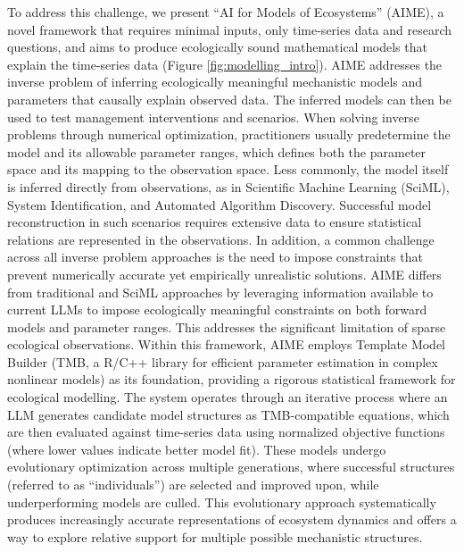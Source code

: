 To address this challenge, we present ``AI for Models of Ecosystems'' (AIME), a novel framework that requires minimal inputs, only time-series data and research questions, and aims to produce ecologically sound mathematical models that explain the time-series data (Figure \ref{fig:modelling_intro}). AIME addresses the inverse problem of inferring ecologically meaningful mechanistic models and parameters that causally explain observed data. The inferred models can then be used to test management interventions and scenarios. When solving inverse problems through numerical optimization, practitioners usually predetermine the model and its allowable parameter ranges, which defines both the parameter space and its mapping to the observation space. Less commonly, the model itself is inferred directly from observations, as in Scientific Machine Learning (SciML), System Identification, and Automated Algorithm Discovery. Successful model reconstruction in such scenarios requires extensive data to ensure statistical relations are represented in the observations. In addition, a common challenge across all inverse problem approaches is the need to impose constraints that prevent numerically accurate yet empirically unrealistic solutions. AIME differs from traditional and SciML approaches by leveraging information available to current LLMs to impose ecologically meaningful constraints on both forward models and parameter ranges. This addresses the significant limitation of sparse ecological observations. Within this framework, AIME employs Template Model Builder (TMB, a R/C++ library for efficient parameter estimation in complex nonlinear models) as its foundation, providing a rigorous statistical framework for ecological modelling. The system operates through an iterative process where an LLM generates candidate model structures as TMB-compatible equations, which are then evaluated against time-series data using normalized objective functions (where lower values indicate better model fit). These models undergo evolutionary optimization across multiple generations, where successful structures (referred to as ``individuals'') are selected and improved upon, while underperforming models are culled. This evolutionary approach systematically produces increasingly accurate representations of ecosystem dynamics and offers a way to explore relative support for multiple possible mechanistic structures.

